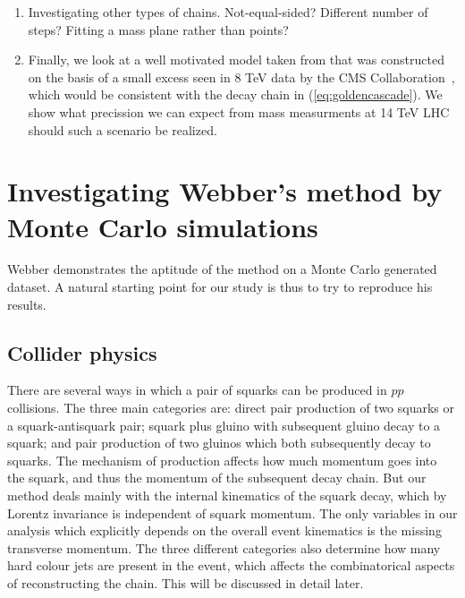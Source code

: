 \documentclass[twoside,english]{uiofysmaster}
\begin{document}
\begin{enumerate}
	\item Investigating other types of chains. Not-equal-sided? Different number of steps? Fitting a mass plane rather than points?
	\item Finally, we look at a well motivated model taken from \cite{Allanach:2014gsa} that was constructed on the basis of a small excess seen in 8 TeV data by the CMS Collaboration~\cite{CMS:2014jfa}, which would be consistent with the decay chain in (\ref{eq:goldencascade}). We show what precission we can expect from mass measurments at 14 TeV LHC should such a scenario be realized.
\end{enumerate}






























\chapter{Investigating Webber's method by Monte Carlo simulations}
\label{ch:MC}
Webber demonstrates the aptitude of the method on a Monte Carlo generated dataset. A natural starting point for our study is thus to try to reproduce his results. 

\section{Collider physics}
There are several ways in which a pair of squarks can be produced in $pp$ collisions. The three main categories are: direct pair production of two squarks or a squark-antisquark pair; squark plus gluino with subsequent gluino decay to a squark; and pair production of two gluinos which both subsequently decay to squarks. The mechanism of production affects how much momentum goes into the squark, and thus the momentum of the subsequent decay chain. But our method deals mainly with the internal kinematics of the squark decay, which by Lorentz invariance is independent of squark momentum. The only variables in our analysis which explicitly depends on the overall event kinematics is the missing transverse momentum. The three different categories also determine how many hard colour jets are present in the event, which affects the combinatorical aspects of reconstructing the chain. This will be discussed in detail later.
\end{document}
